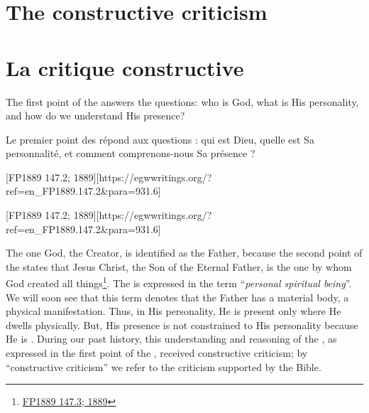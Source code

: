 \chapter{The constructive criticism}


\chapter{La critique constructive}


The first point of the  answers the questions: who is God, what is His personality, and how do we understand His presence?


Le premier point des  répond aux questions : qui est Dieu, quelle est Sa personnalité, et comment comprenons-nous Sa présence ?


[FP1889 147.2; 1889][https://egwwritings.org/?ref=en\_FP1889.147.2&para=931.6]


[FP1889 147.2; 1889][https://egwwritings.org/?ref=en\_FP1889.147.2&para=931.6]


The one God, the Creator, is identified as the Father, because the second point of the  states that Jesus Christ, the Son of the Eternal Father, is the one by whom God created all things\footnote{\href{https://egwwritings.org/?ref=en_FP1889.147.3&para=931.7}{FP1889 147.3; 1889}}. The  is expressed in the term “\textit{personal spiritual being}”. We will soon see that this term denotes that the Father has a material body, a physical manifestation. Thus, in His personality, He is present only where He dwells physically. But, His presence is not constrained to His personality because He is . During our past history, this understanding and reasoning of the , as expressed in the first point of the , received constructive criticism; by “constructive criticism” we refer to the criticism supported by the Bible.


